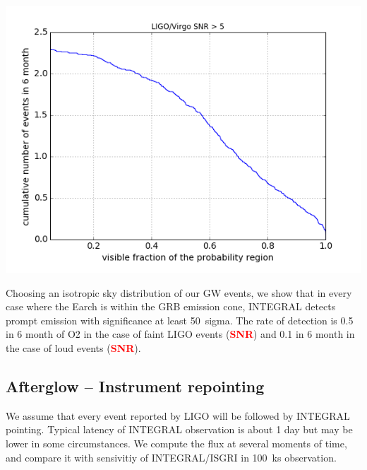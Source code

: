 \documentclass[a0,portrait]{a0poster}
\newcommand{\vs}[1] {\textbf{\textcolor{red}{#1}}}
\begin{document}
\begin{multicols}{2}
\begin{center}\vspace{.5cm}
    \includegraphics[scale=.6]{figures/covered_region.png}
    \label{covered_region}
\end{center}

Choosing an isotropic sky distribution of our GW events, we show that
in every case where the Earch is within the GRB emission cone,
INTEGRAL detects prompt emission with significance at least 50~sigma.
The rate of detection is 0.5 in 6 month of O2 in the case of faint
LIGO events (\vs{SNR}) and 0.1 in 6 month in the case of loud events
(\vs{SNR}).

\subsection*{Afterglow -- Instrument repointing}

We assume that every event reported by LIGO will be followed by
INTEGRAL pointing. Typical latency of INTEGRAL observation is about 1
day but may be lower in some circumstances. We compute the flux at
several moments of time, and compare it with sensivitiy of
INTEGRAL/ISGRI in 100~ks observation.


\end{multicols}
\end{document}
